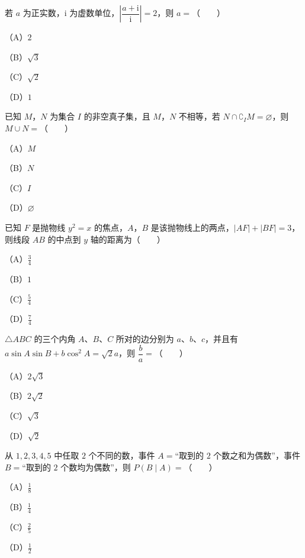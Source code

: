 

\begin{question}
若 $a$ 为正实数，$\mathrm i$ 为虚数单位，$\left|\dfrac{a+\mathrm i}{\mathrm i}\right|=2$，则 $a=$\mbox{（　　）}

（A）$2$

（B）$\sqrt3$

（C）$\sqrt2$

（D）$1$

\end{question}
\begin{question}
已知 $M$，$N$ 为集合 $I$ 的非空真子集，且 $M$，$N$ 不相等，若 $N\cap\complement_I M=\varnothing$，则 $M\cup N=$\mbox{（　　）}

（A）$M$

（B）$N$

（C）$I$

（D）$\varnothing$

\end{question}
\begin{question}
已知 $F$ 是抛物线 $y^2=x$ 的焦点，$A$，$B$ 是该抛物线上的两点，$|AF|+|BF|=3$，则线段 $AB$ 的中点到 $y$ 轴的距离为\mbox{（　　）}

（A）$\frac34$

（B）$1$

（C）$\frac54$

（D）$\frac74$

\end{question}
\begin{question}
$\triangle ABC$ 的三个内角 $A$、$B$、$C$ 所对的边分别为 $a$、$b$、$c$，并且有 $a\sin A\sin B+b\cos^2A=\sqrt2a$，则 $\dfrac ba=$\mbox{（　　）}

（A）$2\sqrt3$

（B）$2\sqrt2$

（C）$\sqrt3$

（D）$\sqrt2$

\end{question}
\begin{question}
从 $1,2,3,4,5$ 中任取 $2$ 个不同的数，事件 $A=$“取到的 $2$ 个数之和为偶数”，事件 $B=$“取到的 $2$ 个数均为偶数”，则 $P(B\mid A)=$\mbox{（　　）}

（A）$\frac18$

（B）$\frac14$

（C）$\frac25$

（D）$\frac12$

\Needspace{0.4\textheight}
\end{question}
